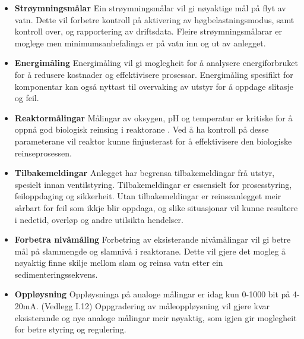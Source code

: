 \begin{itemize}
    \item \textbf{Strøymningsmålar} \newline
        Ein strøymningsmålar vil gi nøyaktige mål på flyt av vatn.
        Dette vil forbetre kontroll på aktivering av høgbelastningsmodus, samt kontroll over, og rapportering av driftsdata.
        Fleire strøymningsmålarar er moglege men minimumsanbefalinga er på vatn inn og ut av anlegget.
    \item \textbf{Energimåling} \newline
        Energimåling vil gi moglegheit for å analysere energiforbruket for å redusere kostnader og effektivisere prosessar.
        Energimåling spesifikt for komponentar kan også nyttast til overvaking av utstyr for å oppdage slitasje og feil.
    \item \textbf{Reaktormålingar} \newline
        Målingar av oksygen, pH og temperatur er kritiske for å oppnå god biologisk reinsing i reaktorane \citep{SNL_PH}. \newline
        Ved å ha kontroll på desse parameterane vil reaktor kunne finjusterast for å effektivisere den biologiske reinseprosessen.
    \item \textbf{Tilbakemeldingar} \newline
        Anlegget har begrensa tilbakemeldingar frå utstyr, spesielt innan ventilstyring.
        Tilbakemeldingar er essensielt for prosesstyring, feiloppdaging og sikkerheit.
        Utan tilbakemeldingar er reinseanlegget meir sårbart for feil som ikkje blir oppdaga, 
        og slike situasjonar vil kunne resultere i nedetid, overløp og andre utilsikta hendelser.
    \item \textbf{Forbetra nivåmåling} \newline
        Forbetring av eksisterande nivåmålingar vil gi betre mål på slammengde og slamnivå i reaktorane.
        Dette vil gjere det mogleg å nøyaktig finne skilje mellom slam og reinsa vatn etter ein sedimenteringssekvens.
    \item \textbf{Oppløysning} \newline
        Oppløysninga på analoge målingar er idag kun 0-1000 bit på 4-20mA. (Vedlegg I.12)\newline
        Oppgradering av måleoppløysning vil gjere kvar eksisterande og nye analoge målingar
        meir nøyaktig, som igjen gir moglegheit for betre styring og regulering.
\end{itemize}
\newpage


